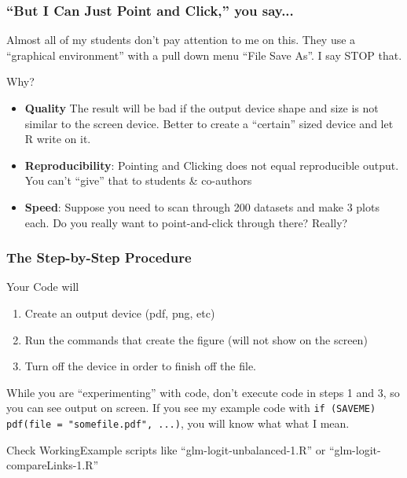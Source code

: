 \documentclass[11pt,english]{beamer}
\begin{document}
\begin{frame}
  \frametitle {``But I Can Just Point and Click,'' you say...}

  Almost all of my students don't pay attention to me on this. They
  use a ``graphical environment'' with a pull down menu
  ``File Save As''.  I say STOP that.

  Why?
  \begin{itemize}
  \item \textbf{Quality} The result will be bad if the output device
    shape and size is not similar to the screen device. Better to
    create a ``certain'' sized device and let R write on it.
  \item \textbf{Reproducibility}: Pointing and Clicking does not equal
    reproducible output. You can't ``give'' that to students \& co-authors
  \item \textbf{Speed}: Suppose you need to scan through 200 datasets
    and make 3 plots each. Do you really want to point-and-click
    through there? Really?
  \end{itemize}
\end{frame}


\begin{frame}
  \frametitle {The Step-by-Step Procedure}

  Your Code will
  \begin{enumerate}
  \item Create an output device (pdf, png, etc)
  \item Run the commands that create the figure (will not show on the screen)

  \item Turn off the device in order to finish off the file.
  \end{enumerate}

  While you are ``experimenting'' with code, don't execute
  code in steps 1 and 3, so you can see output on screen. If you see
  my example code with \texttt{if (SAVEME) pdf(file =
    "somefile.pdf", ...)}, you will know what what I mean.

  Check WorkingExample scripts like ``glm-logit-unbalanced-1.R'' or ``glm-logit-compareLinks-1.R''

\end{frame}

\end{document}
